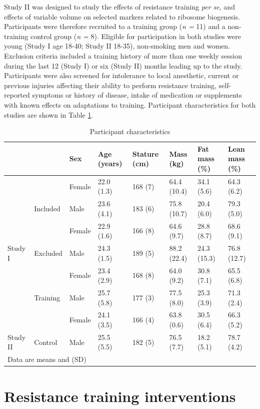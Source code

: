 \documentclass[twoside,10pt]{gihclass} %
\begin{document}
Study II was designed to study the effects of resistance training \emph{per se}, and effects of variable volume on selected markers related to ribosome biogenesis. Participants were therefore recruited to a training group (\emph{n =} 11) and a non-training control group (\emph{n =} 8).
Eligible for participation in both studies were young (Study I age 18-40; Study II 18-35), non-smoking men and women. Exclusion criteria included a training history of more than one weekly session during the last 12 (Study I) or six (Study II) months leading up to the study. Participants were also screened for intolerance to local anesthetic, current or previous injuries affecting their ability to perform resistance training, self-reported symptoms or history of disease, intake of medication or supplements with known effects on adaptations to training. Participant characteristics for both studies are shown in Table \ref{tab:characteristics-table}.
\begin{table}

\caption{\label{tab:characteristics-table}Participant characteristics}
\centering
\fontsize{7}{9}\selectfont
\begin{tabular}[t]{llllllll}
\toprule
  &   & Sex & Age (years) & Stature
(cm) & Mass (kg) & Fat mass (\%) & Lean mass (\%)\\
\midrule
 &  & Female & 22.0 (1.3) & 168 (7) & 64.4 (10.4) & 34.1 (5.6) & 64.3 (6.2)\\
\cmidrule{3-8}
 & \multirow{-2}{*}{\raggedright\arraybackslash Included} & Male & 23.6 (4.1) & 183 (6) & 75.8 (10.7) & 20.4 (6.0) & 79.3 (5.0)\\
\cmidrule{2-8}
 &  & Female & 22.9 (1.6) & 166 (8) & 64.6 (9.7) & 28.8 (8.7) & 68.6 (9.1)\\
\cmidrule{3-8}
\multirow{-4}{*}{\raggedright\arraybackslash Study I} & \multirow{-2}{*}{\raggedright\arraybackslash Excluded} & Male & 24.3 (1.5) & 189 (5) & 88.2 (22.4) & 24.3 (15.3) & 76.8 (12.7)\\
\cmidrule{1-8}
 &  & Female & 23.4 (2.9) & 168 (8) & 64.0 (9.2) & 30.8 (7.1) & 65.5 (6.8)\\
\cmidrule{3-8}
 & \multirow{-2}{*}{\raggedright\arraybackslash Training} & Male & 25.7 (5.8) & 177 (3) & 77.5 (8.0) & 25.3 (3.9) & 71.3 (2.4)\\
\cmidrule{2-8}
 &  & Female & 24.1 (3.5) & 166 (4) & 63.8 (0.6) & 30.5 (6.4) & 66.3 (5.2)\\
\cmidrule{3-8}
\multirow{-4}{*}{\raggedright\arraybackslash Study II} & \multirow{-2}{*}{\raggedright\arraybackslash Control} & Male & 25.5 (5.5) & 182 (5) & 76.5 (7.7) & 18.2 (5.1) & 78.7 (4.2)\\
\bottomrule
\multicolumn{8}{l}{\rule{0pt}{1em}Data are means and (SD)}\\
\end{tabular}
\end{table}
\hypertarget{resistance-training-interventions}{%
\section{Resistance training interventions}\label{resistance-training-interventions}}
\end{document}
